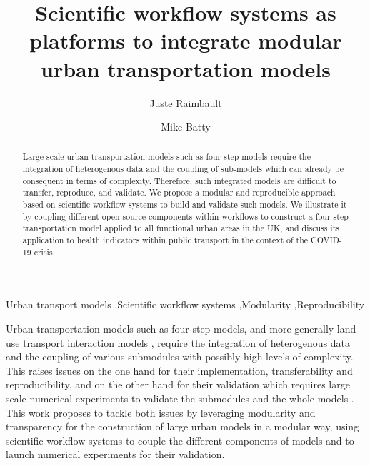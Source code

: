 \documentclass[3p,times,procedia]{elsarticle}
\begin{document}
\begin{frontmatter}


\title{Scientific workflow systems as platforms to integrate modular urban transportation models}

\author[a,b,c]{Juste Raimbault}
\author[a]{Mike Batty}

\address[a]{CASA, University College London, London, United Kingdom}
\address[b]{UPS CNRS 3611 Complex Systems Institute, Paris, France}
\address[c]{UMR CNRS 8504 G{\'e}ographie-cit{\'e}s, Paris, France}

\begin{abstract}
Large scale urban transportation models such as four-step models require the integration of heterogenous data and the coupling of sub-models which can already be consequent in terms of complexity. Therefore, such integrated models are difficult to transfer, reproduce, and validate. We propose a modular and reproducible approach based on scientific workflow systems to build and validate such models. We illustrate it by coupling different open-source components within workflows to construct a four-step transportation model applied to all functional urban areas in the UK, and discuss its application to health indicators within public transport in the context of the COVID-19 crisis.
\end{abstract}

\begin{keyword}
Urban transport models \sep Scientific workflow systems \sep Modularity \sep Reproducibility
\end{keyword}
\end{frontmatter}





Urban transportation models such as four-step models, and more generally land-use transport interaction models \citep{wegener2004land}, require the integration of heterogenous data and the coupling of various submodules with possibly high levels of complexity. This raises issues on the one hand for their implementation, transferability and reproducibility, and on the other hand for their validation which requires large scale numerical experiments to validate the submodules and the whole models \citep{lee1973requiem,batty2014can}. This work proposes to tackle both issues by leveraging modularity and transparency for the construction of large urban models in a modular way, using scientific workflow systems \citep{barker2007scientific} to couple the different components of models and to launch numerical experiments for their validation.
\end{document}
